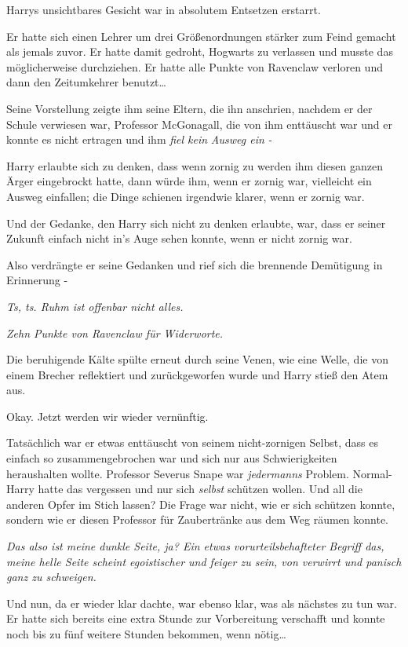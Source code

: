 {Harrys unsichtbares Gesicht war in absolutem Entsetzen erstarrt.

Er hatte sich einen Lehrer um drei Größenordnungen stärker zum Feind gemacht als jemals zuvor. Er hatte damit gedroht, Hogwarts zu verlassen und musste das möglicherweise durchziehen. Er hatte alle Punkte von Ravenclaw verloren und dann den Zeitumkehrer benutzt…

Seine Vorstellung zeigte ihm seine Eltern, die ihn anschrien, nachdem er der Schule verwiesen war, Professor McGonagall, die von ihm enttäuscht war und er konnte es nicht ertragen und ihm \emph{fiel kein} \emph{Ausweg ein} \emph{-}

Harry erlaubte sich zu denken, dass wenn zornig zu werden ihm diesen ganzen Ärger eingebrockt hatte, dann würde ihm, wenn er zornig war, vielleicht ein Ausweg einfallen; die Dinge schienen irgendwie klarer, wenn er zornig war.

Und der Gedanke, den Harry sich nicht zu denken erlaubte, war, dass er seiner Zukunft einfach nicht in's Auge sehen konnte, wenn er nicht zornig war.

Also verdrängte er seine Gedanken und rief sich die brennende Demütigung in Erinnerung -

\emph{Ts, ts. Ruhm ist offenbar nicht alles.}

\emph{Zehn Punkte von Ravenclaw für Widerworte.}

Die beruhigende Kälte spülte erneut durch seine Venen, wie eine Welle, die von einem Brecher reflektiert und zurückgeworfen wurde und Harry stieß den Atem aus.

Okay. Jetzt werden wir wieder vernünftig.

Tatsächlich war er etwas enttäuscht von seinem nicht-zornigen Selbst, dass es einfach so zusammengebrochen war und sich nur aus Schwierigkeiten heraushalten wollte. Professor Severus Snape war \emph{jedermanns} Problem. Normal-Harry hatte das vergessen und nur sich \emph{selbst} schützen wollen. Und all die anderen Opfer im Stich lassen? Die Frage war nicht, wie er sich schützen konnte, sondern wie er diesen Professor für Zaubertränke aus dem Weg räumen konnte.

\emph{Das also ist meine dunkle Seite, ja? Ein etwas vorurteilsbehafteter Begriff das, meine helle Seite scheint egoistischer und feiger zu sein, von verwirrt und panisch ganz zu schweigen.}

Und nun, da er wieder klar dachte, war ebenso klar, was als nächstes zu tun war. Er hatte sich bereits eine extra Stunde zur Vorbereitung verschafft und konnte noch bis zu fünf weitere Stunden bekommen, wenn nötig…

}
